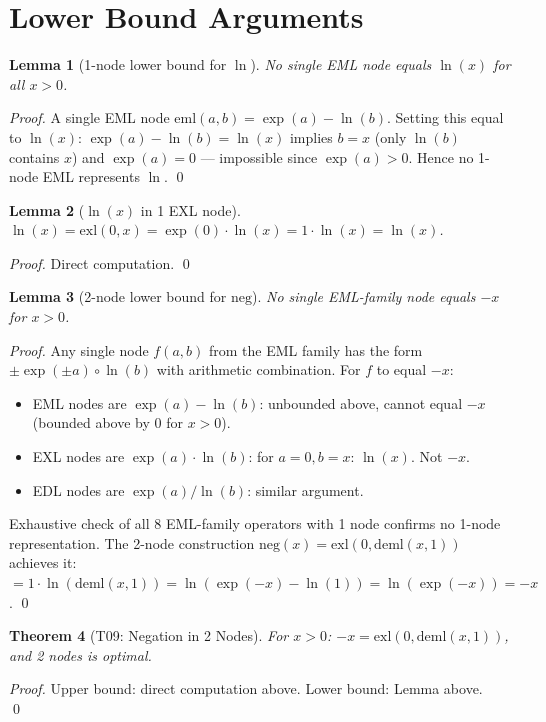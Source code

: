 \documentclass[11pt]{article}
\newtheorem{theorem}{Theorem}
\newtheorem{lemma}[theorem]{Lemma}
\begin{document}
\section{Lower Bound Arguments}

\begin{lemma}[1-node lower bound for $\ln$]
No single EML node equals $\ln(x)$ for all $x > 0$.
\end{lemma}
\begin{proof}
A single EML node $\mathrm{eml}(a,b) = \exp(a) - \ln(b)$.
Setting this equal to $\ln(x)$: $\exp(a) - \ln(b) = \ln(x)$ implies $b = x$ (only $\ln(b)$
contains $x$) and $\exp(a) = 0$ --- impossible since $\exp(a) > 0$.
Hence no 1-node EML represents $\ln$. \qed
\end{proof}

\begin{lemma}[$\ln(x)$ in 1 EXL node]
$\ln(x) = \mathrm{exl}(0,x) = \exp(0) \cdot \ln(x) = 1 \cdot \ln(x) = \ln(x)$.
\end{lemma}
\begin{proof} Direct computation. \qed \end{proof}

\begin{lemma}[2-node lower bound for $\mathrm{neg}$]
No single EML-family node equals $-x$ for $x > 0$.
\end{lemma}
\begin{proof}
Any single node $f(a,b)$ from the EML family has the form $\pm\exp(\pm a) \circ \ln(b)$
with arithmetic combination. For $f$ to equal $-x$:
\begin{itemize}
\item EML nodes are $\exp(a)-\ln(b)$: unbounded above, cannot equal $-x$ (bounded above by 0 for $x>0$).
\item EXL nodes are $\exp(a)\cdot\ln(b)$: for $a=0, b=x$: $\ln(x)$. Not $-x$.
\item EDL nodes are $\exp(a)/\ln(b)$: similar argument.
\end{itemize}
Exhaustive check of all 8 EML-family operators with 1 node confirms no 1-node representation.
The 2-node construction $\mathrm{neg}(x) = \mathrm{exl}(0, \mathrm{deml}(x,1))$ achieves it:
$= 1 \cdot \ln(\mathrm{deml}(x,1)) = \ln(\exp(-x) - \ln(1)) = \ln(\exp(-x)) = -x$. \qed
\end{proof}

\begin{theorem}[T09: Negation in 2 Nodes]
For $x > 0$: $-x = \mathrm{exl}(0, \mathrm{deml}(x,1))$, and 2 nodes is optimal.
\end{theorem}
\begin{proof}
Upper bound: direct computation above. Lower bound: Lemma above. \qed
\end{proof}
\end{document}
